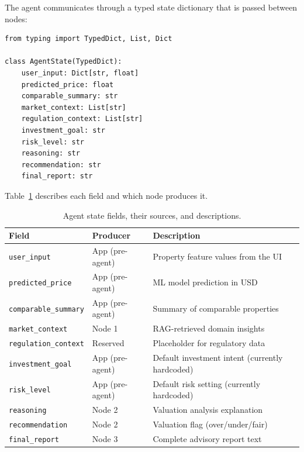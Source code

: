 \documentclass[11pt,a4paper]{article}
\begin{document}
The agent communicates through a typed state dictionary that is passed between nodes:

\begin{lstlisting}[caption={Agent state definition (\texttt{src/agent/state.py}).}]
from typing import TypedDict, List, Dict

class AgentState(TypedDict):
    user_input: Dict[str, float]
    predicted_price: float
    comparable_summary: str
    market_context: List[str]
    regulation_context: List[str]
    investment_goal: str
    risk_level: str
    reasoning: str
    recommendation: str
    final_report: str
\end{lstlisting}

Table~\ref{tab:state-fields} describes each field and which node produces it.

\begin{table}[H]
    \centering
    \caption{Agent state fields, their sources, and descriptions.}
    \label{tab:state-fields}
    \begin{tabular}{lll}
        \toprule
        \textbf{Field} & \textbf{Producer} & \textbf{Description} \\
        \midrule
        \texttt{user\_input} & App (pre-agent) & Property feature values from the UI \\
        \texttt{predicted\_price} & App (pre-agent) & ML model prediction in USD \\
        \texttt{comparable\_summary} & App (pre-agent) & Summary of comparable properties \\
        \texttt{market\_context} & Node 1 & RAG-retrieved domain insights \\
        \texttt{regulation\_context} & Reserved & Placeholder for regulatory data \\
        \texttt{investment\_goal} & App (pre-agent) & Default investment intent (currently hardcoded) \\
        \texttt{risk\_level} & App (pre-agent) & Default risk setting (currently hardcoded) \\
        \texttt{reasoning} & Node 2 & Valuation analysis explanation \\
        \texttt{recommendation} & Node 2 & Valuation flag (over/under/fair) \\
        \texttt{final\_report} & Node 3 & Complete advisory report text \\
        \bottomrule
    \end{tabular}
\end{table}
\end{document}
